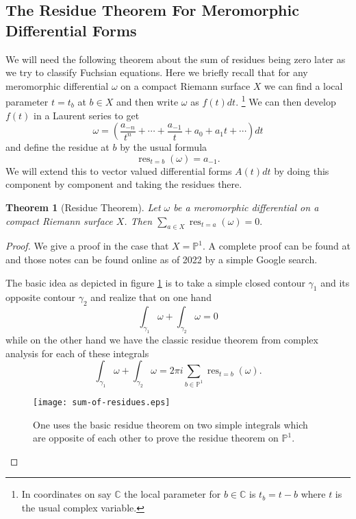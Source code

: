 \documentclass[]{book}
\numberwithin{equation}{section}
\newtheorem{theorem}{Theorem}[subsection]
\theoremstyle{definition}
\theoremstyle{remark}
\newcommand{\CC}{\mathbb{C}}
\newcommand{\PP}{\mathbb{P}}
\newcommand{\res}{\operatorname{res}}
\begin{document}
\subsection{The Residue Theorem For Meromorphic Differential Forms}\label{S:residue-theorem}
We will need the following theorem about the sum of residues being zero later as we try to classify Fuchsian equations.
Here we briefly recall that for any meromorphic differential $\omega$ on a compact Riemann surface $X$ we can find a local parameter $t=t_b$ at $b\in X$ and then write $\omega$ as $f(t)dt$. \footnote{In coordinates on say $\CC$ the local parameter for $b\in  \CC$ is $t_b=t-b$ where $t$ is the usual complex variable. }
We can then develop $f(t)$ in a Laurent series to get 
$$ \omega =  \left(\frac{a_{-n} }{t^n} + \cdots + \frac{a_{-1}}{t} + a_0 + a_1 t + \cdots  \right) dt$$
and define the residue at $b$ by the usual formula 
$$ \res_{t=b}(\omega) = a_{-1}.$$
We will extend this to vector valued differential forms $A(t)dt$  by doing this component by component and taking the residues there.
\begin{theorem}[Residue Theorem]\label{T:residue-theorem}
	Let $\omega$ be a meromorphic differential on a compact Riemann surface $X$. 
	Then $ \sum_{a \in X} \res_{t=a}(\omega) =0.$
\end{theorem}
\begin{proof}
	We give a proof in the case that $X=\PP^1$. 
	A complete proof can be found at \cite[Proposition 6.6]{Schlag2014} and those notes can be found online as of 2022 by a simple Google search.
	
	The basic idea as depicted in figure \ref{F:sum-of-residues} is to take a simple closed contour $\gamma_1$ and its opposite contour $\gamma_2$ and realize that on one hand 
	$$ \int_{\gamma_1}\omega + \int_{\gamma_2} \omega =0 $$
	while on the other hand we have the classic residue theorem from complex analysis for each of these integrals
	$$ \int_{\gamma_1}\omega + \int_{\gamma_2}\omega = 2\pi i \sum_{b \in \PP^1} \res_{t=b}(\omega).$$
	\begin{figure}[h]\label{F:sum-of-residues}
		\begin{center}
			\texttt{[image: sum-of-residues.eps]}
		\end{center}
		\caption{One uses the basic residue theorem on two simple integrals which are opposite of each other to prove the residue theorem on $\PP^1$. }
	\end{figure}
\end{proof}
\end{document}
